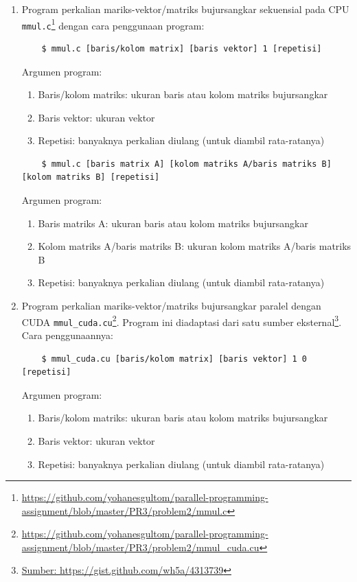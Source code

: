 \begin{enumerate}
	\item Program perkalian mariks-vektor/matriks bujursangkar sekuensial pada CPU \verb|mmul.c|\footnote{\url{https://github.com/yohanesgultom/parallel-programming-assignment/blob/master/PR3/problem2/mmul.c}} dengan cara penggunaan program:
	
	\begin{lstlisting}
	$ mmul.c [baris/kolom matrix] [baris vektor] 1 [repetisi]
	\end{lstlisting}
	
	Argumen program:
	\begin{enumerate}
		\item Baris/kolom matriks: ukuran baris atau kolom matriks bujursangkar
		\item Baris vektor: ukuran vektor
		\item Repetisi: banyaknya perkalian diulang (untuk diambil rata-ratanya)
	\end{enumerate}
	
	\begin{lstlisting}
	$ mmul.c [baris matrix A] [kolom matriks A/baris matriks B] [kolom matriks B] [repetisi]
	\end{lstlisting}
	
	Argumen program:
	\begin{enumerate}
		\item Baris matriks A: ukuran baris atau kolom matriks bujursangkar
		\item Kolom matriks A/baris matriks B: ukuran kolom matriks A/baris matriks B
		\item Repetisi: banyaknya perkalian diulang (untuk diambil rata-ratanya)
	\end{enumerate}
	
	\item Program perkalian mariks-vektor/matriks bujursangkar paralel dengan CUDA \verb|mmul_cuda.cu|\footnote{\url{https://github.com/yohanesgultom/parallel-programming-assignment/blob/master/PR3/problem2/mmul_cuda.cu}}. Program ini diadaptasi dari satu sumber eksternal\footnote{\url{Sumber: https://gist.github.com/wh5a/4313739}}. Cara penggunaannya:
	
	\begin{lstlisting}
	$ mmul_cuda.cu [baris/kolom matrix] [baris vektor] 1 0 [repetisi]
	\end{lstlisting}
	
	Argumen program:
	\begin{enumerate}
		\item Baris/kolom matriks: ukuran baris atau kolom matriks bujursangkar
		\item Baris vektor: ukuran vektor
		\item Repetisi: banyaknya perkalian diulang (untuk diambil rata-ratanya)
	\end{enumerate}


\end{enumerate}
